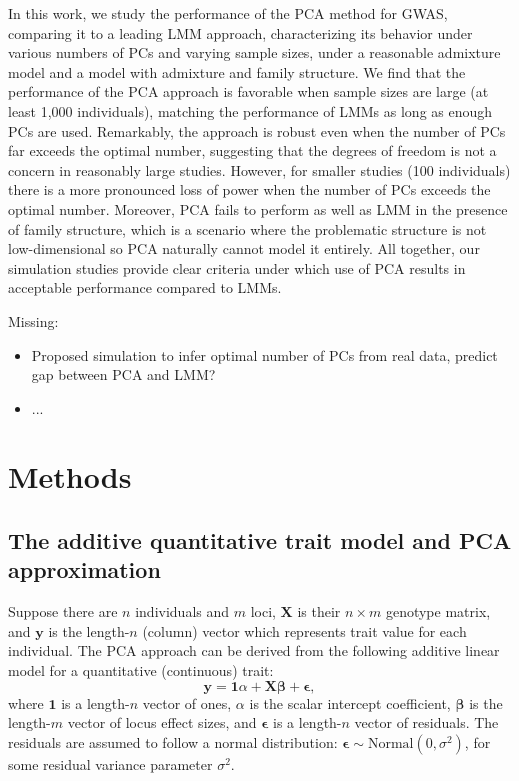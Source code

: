 \documentclass[12pt]{article}
\begin{document}
In this work, we study the performance of the PCA method for GWAS, comparing it to a leading LMM approach, characterizing its behavior under various numbers of PCs and varying sample sizes, under a reasonable admixture model and a model with admixture and family structure.
We find that the performance of the PCA approach is favorable when sample sizes are large (at least 1,000 individuals), matching the performance of LMMs as long as enough PCs are used.
Remarkably, the approach is robust even when the number of PCs far exceeds the optimal number, suggesting that the degrees of freedom is not a concern in reasonably large studies.
However, for smaller studies (100 individuals) there is a more pronounced loss of power when the number of PCs exceeds the optimal number.
Moreover, PCA fails to perform as well as LMM in the presence of family structure, which is a scenario where the problematic structure is not low-dimensional so PCA naturally cannot model it entirely.
All together, our simulation studies provide clear criteria under which use of PCA results in acceptable performance compared to LMMs.

Missing:
\begin{itemize}
\item Proposed simulation to infer optimal number of PCs from real data, predict gap between PCA and LMM?
\item ...
\end{itemize}

\section{Methods}

\subsection{The additive quantitative trait model and PCA approximation}

Suppose there are $n$ individuals and $m$ loci,
$\mathbf{X}$ is their $n \times m$ genotype matrix, and
$\mathbf{y}$ is the length-$n$ (column) vector which represents trait value for each individual.
The PCA approach can be derived from the following additive linear model for a quantitative (continuous) trait:
$$
\mathbf{y}
=
\mathbf{1} \alpha + \mathbf{X} \mathbf{\beta} + \mathbf{\epsilon}
,
$$
where
$\mathbf{1}$ is a length-$n$ vector of ones,
$\alpha$ is the scalar intercept coefficient,
$\mathbf{\beta}$ is the length-$m$ vector of locus effect sizes, and
$\mathbf{\epsilon}$ is a length-$n$ vector of residuals.
The residuals are assumed to follow a normal distribution: $\mathbf{\epsilon} \sim \text{Normal}(0, \sigma^2)$, for some residual variance parameter $\sigma^2$.
\end{document}
